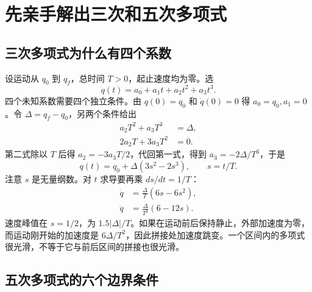 \section{先亲手解出三次和五次多项式}

\subsection{三次多项式为什么有四个系数}

设运动从 $q_0$ 到 $q_f$，总时间 $T>0$，起止速度均为零。选
\begin{equation}
q(t)=a_0+a_1t+a_2t^2+a_3t^3.
\end{equation}
四个未知系数需要四个独立条件。由 $q(0)=q_0$ 和 $\dot q(0)=0$ 得 $a_0=q_0,a_1=0$。令 $\Delta=q_f-q_0$，另两个条件给出
\begin{align}
a_2T^2+a_3T^3&=\Delta,\\
2a_2T+3a_3T^2&=0.
\end{align}
第二式除以 $T$ 后得 $a_2=-3a_3T/2$，代回第一式，得到 $a_3=-2\Delta/T^3$，于是
\begin{equation}
q(t)=q_0+\Delta(3s^2-2s^3),\qquad s=t/T.
\end{equation}
注意 $s$ 是无量纲数。对 $t$ 求导要再乘 $ds/dt=1/T$：
\begin{align}
\dot q&=\frac{\Delta}{T}(6s-6s^2),\\
\ddot q&=\frac{\Delta}{T^2}(6-12s).
\end{align}
速度峰值在 $s=1/2$，为 $1.5|\Delta|/T$。如果在运动前后保持静止，外部加速度为零，而运动刚开始的加速度是 $6\Delta/T^2$，因此拼接处加速度跳变。一个区间内的多项式很光滑，不等于它与前后区间的拼接也很光滑。

\subsection{五次多项式的六个边界条件}

